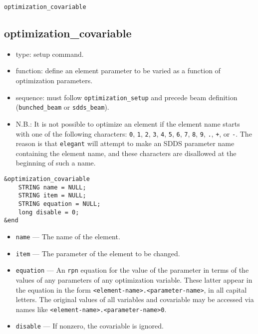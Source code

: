 \documentclass[11pt]{article}
\begin{document}
\newpage
\begin{center}{\Large\verb|optimization_covariable|}\end{center}
\subsection{optimization\_covariable \label{subsec:optimizationcovariable}}

\begin{itemize}
\item type: setup command.
\item function: define an element parameter to be varied as a function of optimization parameters.
\item sequence: must follow \verb|optimization_setup| and precede beam definition (\verb|bunched_beam| or \verb|sdds_beam|).
\item N.B.: It is not possible to optimize an element if the element name starts with one of the following
characters: 
\verb|0|, \verb|1|, \verb|2|, \verb|3|, \verb|4|, \verb|5|, \verb|6|, \verb|7|, \verb|8|,
\verb|9|, \verb|.|, \verb|+|, or \verb|-|.  The reason is that {\tt elegant} will attempt to 
make an SDDS parameter name containing the element name, and these characters are disallowed
at the beginning of such a name.
\end{itemize}

\begin{verbatim}
&optimization_covariable
    STRING name = NULL;
    STRING item = NULL;
    STRING equation = NULL;
    long disable = 0;
&end
\end{verbatim}

\begin{itemize}
\item \verb|name| --- The name of the element.
\item \verb|item| --- The parameter of the element to be changed.
\item \verb|equation| --- An {\tt rpn} equation for the value of the parameter in terms of the
values of any parameters of any optimization variable.  These latter appear in the equation in the
form \verb|<element-name>.<parameter-name>|, in all capital letters.  The original values of all
variables and covariable may be accessed via names like \verb|<element-name>.<parameter-name>0|.
\item \verb|disable| --- If nonzero, the covariable is ignored.
\end{itemize}
\end{document}
